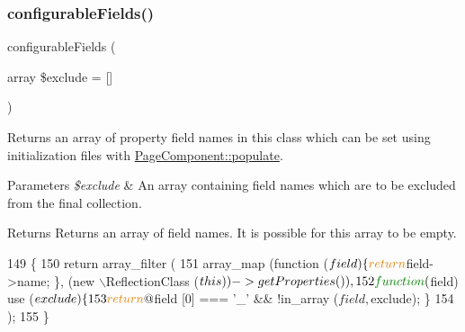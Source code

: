 \mbox{\label{class_lora_1_1_page_component_a3b38056ae9a3c2cada8000895f46b9cb}} 
\subsubsection{\texorpdfstring{configurable\+Fields()}{configurableFields()}}
{\footnotesize\ttfamily configurable\+Fields (\begin{DoxyParamCaption}\item[{array}]{\$exclude = {\ttfamily \mbox{[}\mbox{]}} }\end{DoxyParamCaption})\hspace{0.3cm}{\ttfamily [private]}}

Returns an array of property field names in this class which can be set using initialization files with \hyperlink{class_lora_1_1_page_component_a8a5a7e2a8a27e02e0e68243d88ee339c}{Page\+Component\+::populate}. 
\begin{DoxyParams}{Parameters}
{\em \$exclude} & An array containing field names which are to be excluded from the final collection. \\
\hline
\end{DoxyParams}
\begin{DoxyReturn}{Returns}
Returns an array of field names. It is possible for this array to be empty. 
\end{DoxyReturn}

\begin{DoxyCode}
149                                                               \{
150         \textcolor{keywordflow}{return} array\_filter (
151             array\_map (\textcolor{keyword}{function} ($field) \{ \textcolor{keywordflow}{return} $field->name; \}, (new \(\backslash\)ReflectionClass ($this))->
      getProperties ()),
152             \textcolor{keyword}{function} ($field) use ($exclude) \{
153                 \textcolor{keywordflow}{return} @$field [0] === \textcolor{charliteral}{'\_'} && !in\_array ($field, $exclude); \}
154         );
155     \}
\end{DoxyCode}
\mbox{\label{class_lora_1_1_page_component_ab6c03d0ec66cb31bfc74a784387cef33}} 
